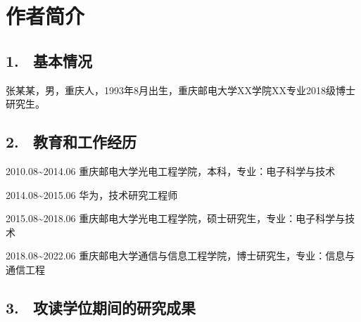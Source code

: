 \specialsectioning

\chapter{作者简介}
\thispagestyle{others}
\pagestyle{others}


\section{1. \ 基本情况}
张某某，男，重庆人，1993年8月出生，重庆邮电大学XX学院XX专业2018级博士研究生。

\section{2. \ 教育和工作经历}
%	
2010.08\textasciitilde2014.06 \quad 重庆邮电大学光电工程学院，本科，专业：电子科学与技术 

2014.08\textasciitilde2015.06 \quad 华为，技术研究工程师 

2015.08\textasciitilde2018.06 \quad 重庆邮电大学光电工程学院，硕士研究生，专业：电子科学与技术 

2018.08\textasciitilde2022.06 \quad 重庆邮电大学通信与信息工程学院，博士研究生，专业：信息与通信工程

\section{3. \ 攻读学位期间的研究成果}

